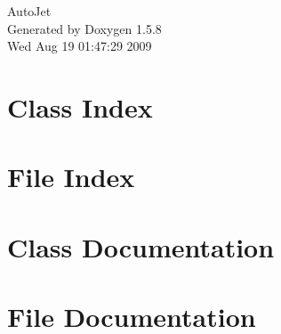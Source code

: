 \documentclass[a4paper]{book}
\begin{document}
\begin{titlepage}
\vspace*{7cm}
\begin{center}
{\Large AutoJet }\\
\vspace*{1cm}
{\large Generated by Doxygen 1.5.8}\\
\vspace*{0.5cm}
{\small Wed Aug 19 01:47:29 2009}\\
\end{center}
\end{titlepage}
\clearemptydoublepage
{}
\tableofcontents
\clearemptydoublepage
{}
\chapter{Class Index}

\chapter{File Index}

\chapter{Class Documentation}




\chapter{File Documentation}









\printindex
\end{document}
